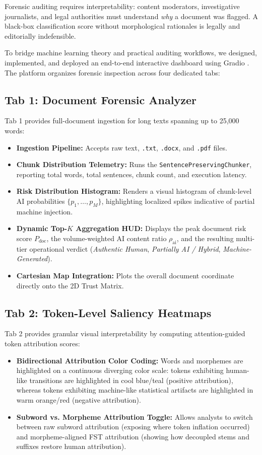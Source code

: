 Forensic auditing requires interpretability: content moderators, investigative journalists, and legal authorities must understand \textit{why} a document was flagged. A black-box classification score without morphological rationales is legally and editorially indefensible.

To bridge machine learning theory and practical auditing workflows, we designed, implemented, and deployed an end-to-end interactive dashboard using Gradio \citep{anekesh2026unified}. The platform organizes forensic inspection across four dedicated tabs:

\subsection{Tab 1: Document Forensic Analyzer}
Tab 1 provides full-document ingestion for long texts spanning up to 25,000 words:
\begin{itemize}
    \item \textbf{Ingestion Pipeline:} Accepts raw text, \texttt{.txt}, \texttt{.docx}, and \texttt{.pdf} files.
    \item \textbf{Chunk Distribution Telemetry:} Runs the \texttt{SentencePreservingChunker}, reporting total words, total sentences, chunk count, and execution latency.
    \item \textbf{Risk Distribution Histogram:} Renders a visual histogram of chunk-level AI probabilities $\{p_1, \dots, p_M\}$, highlighting localized spikes indicative of partial machine injection.
    \item \textbf{Dynamic Top-$K$ Aggregation HUD:} Displays the peak document risk score $P_{\text{doc}}$, the volume-weighted AI content ratio $\rho_{\text{ai}}$, and the resulting multi-tier operational verdict (\textit{Authentic Human}, \textit{Partially AI / Hybrid}, \textit{Machine-Generated}).
    \item \textbf{Cartesian Map Integration:} Plots the overall document coordinate directly onto the 2D Trust Matrix.
\end{itemize}

\subsection{Tab 2: Token-Level Saliency Heatmaps}
Tab 2 provides granular visual interpretability by computing attention-guided token attribution scores:
\begin{itemize}
    \item \textbf{Bidirectional Attribution Color Coding:} Words and morphemes are highlighted on a continuous diverging color scale: tokens exhibiting human-like transitions are highlighted in cool blue/teal (positive attribution), whereas tokens exhibiting machine-like statistical artifacts are highlighted in warm orange/red (negative attribution).
    \item \textbf{Subword vs. Morpheme Attribution Toggle:} Allows analysts to switch between raw subword attribution (exposing where token inflation occurred) and morpheme-aligned FST attribution (showing how decoupled stems and suffixes restore human attribution).
\end{itemize}

